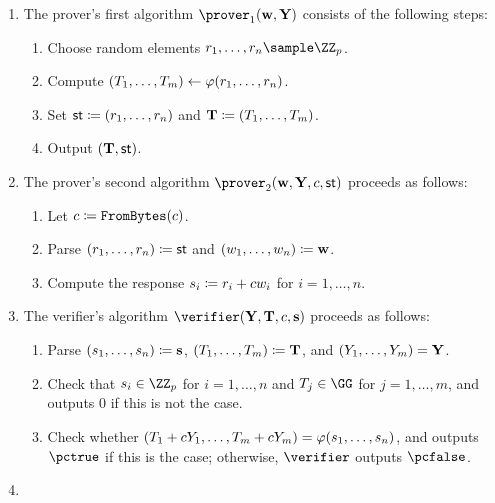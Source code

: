 \documentclass[runningheads,11pt]{article}
\newcommand{\frombytes}{\texttt{FromBytes}}
\begin{document}
\begin{enumerate}
  \item\label{item:basic:p1}
    The prover's first algorithm $\prover_1(\vec \witness,\vec \statement)$ consists of the following steps:
    \begin{enumerate}
      \item\label{item:basic:p1:randomness}
        Choose random elements $r_1,\dots,r_n\sample\ZZ_p$.
      \item
        Compute $(T_1,\dots,T_m)\gets\varphi(r_1,\dots,r_n)$.
      \item Set $\mathsf{st}\coloneqq (r_1,\dots,r_n)$ and $\mathbf {T}\coloneqq(T_1,\dots,T_m)$.
      \item
        Output $(\mathbf {T},\mathsf{st})$.
    \end{enumerate}
  \item\label{item:basic:p2}
    The prover's second algorithm $\prover_2(\vec \witness,\vec Y ,\challenge,\st)$ proceeds as follows:
    \begin{enumerate}
      \item
        Let $c \defeq \frombytes(\challenge)$.
      \item Parse $(r_1,\dots,r_n)\coloneqq \mathsf{st}$ and $(w_1,\dots,w_n)\coloneqq \mathbf {w}$.
      \item Compute the response $s_i\coloneqq r_i+cw_i$ for $i=1,\dots,n$.
    \end{enumerate}
  \item\label{item:basic:v}
    The verifier's algorithm $\verifier(\vec \statement,\vec \commitment,\challenge,\vec \response)$ proceeds as follows:
    \begin{enumerate}
      \item Parse $(s_1, \dots, s_n) \coloneqq \mathbf {s}$, $(T_1, \dots, T_m) \coloneqq \mathbf {T}$, and $(Y_1, \dots, Y_m) = \mathbf {Y}$.
      \item\label{item:basic:v:checks}
        Check that $\response_i\in\ZZ_p$ for $i=1,\dots,n$ and $\commitment_j\in\GG$ for $j=1,\dots,m$, and outputs $0$ if this is not the case.
      \item Check whether $(T_1 + cY_1,\dots,T_m + cY_m) = \varphi(s_1,\dots,s_n)$, and outputs $\accept$ if this is the case; otherwise, $\verifier$ outputs $\reject$.
    \end{enumerate}
  \item\label{item:basic:sim}

\end{enumerate}
\end{document}
